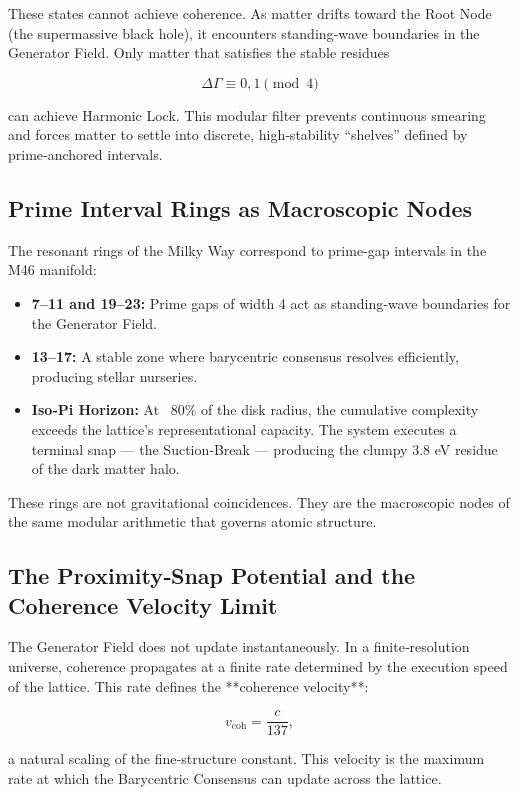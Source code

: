 \documentclass[reprint,amsmath,amssymb,aps,prl,floatfix]{revtex4-2}
\begin{document}
\begin{itemize}
These states cannot achieve coherence. As matter drifts toward the Root Node (the supermassive black hole), it encounters standing‑wave boundaries in the Generator Field. Only matter that satisfies the stable residues

\[
\Delta\Gamma \equiv 0,1 \pmod{4}
\]

can achieve Harmonic Lock. This modular filter prevents continuous smearing and forces matter to settle into discrete, high‑stability “shelves” defined by prime‑anchored intervals.

\subsection{Prime Interval Rings as Macroscopic Nodes}

The resonant rings of the Milky Way correspond to prime‑gap intervals in the M46 manifold:
\begin{itemize}
\item \textbf{7–11 and 19–23:} Prime gaps of width 4 act as standing‑wave boundaries for the Generator Field.  
\item \textbf{13–17:} A stable zone where barycentric consensus resolves efficiently, producing stellar nurseries.  
\item \textbf{Iso‑Pi Horizon:} At ~80\% of the disk radius, the cumulative complexity exceeds the lattice’s representational capacity. The system executes a terminal snap — the Suction‑Break — producing the clumpy 3.8 eV residue of the dark matter halo.
\end{itemize}

These rings are not gravitational coincidences. They are the macroscopic nodes of the same modular arithmetic that governs atomic structure.


\subsection{The Proximity‑Snap Potential and the Coherence Velocity Limit}

The Generator Field does not update instantaneously. In a finite‑resolution universe, coherence propagates at a finite rate determined by the execution speed of the lattice. This rate defines the **coherence velocity**:

\[
v_{\text{coh}} = \frac{c}{137},
\]

a natural scaling of the fine‑structure constant. This velocity is the maximum rate at which the Barycentric Consensus can update across the lattice.


\end{itemize}
\end{document}
